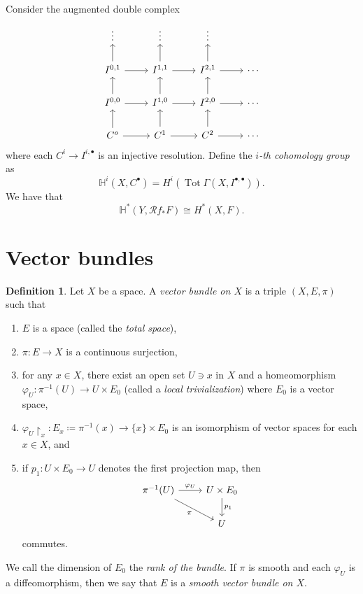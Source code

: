 \documentclass[10pt,letterpaper,cm]{nupset}
\theoremstyle{definition}
\newtheorem{definition}{Definition}[subsection]
\theoremstyle{theorem}
\theoremstyle{remark}
\newcommand{\1}{\mathbb{1}}
\newcommand{\0}{\vec 0}
\DeclareMathOperator{\tot}{Tot}
\begin{document}
Consider the augmented double complex 
\[
\begin{tikzcd}
\vdots                        & \vdots                        & \vdots                        &        \\
{I^{0,1}} \arrow[u] \arrow[r] & {I^{1,1}} \arrow[u] \arrow[r] & {I^{2,1}} \arrow[u] \arrow[r] & \cdots \\
{I^{0,0}} \arrow[u] \arrow[r] & {I^{1,0}} \arrow[u] \arrow[r] & {I^{2,0}} \arrow[u] \arrow[r] & \cdots \\
C^o \arrow[u] \arrow[r]       & C^1 \arrow[u] \arrow[r]       & C^2 \arrow[u] \arrow[r]       & \cdots
\end{tikzcd}
\]
where each $C^i \to I^{i, \bullet}$ is an injective resolution. Define the \textit{$i$-th cohomology group} as $$\mathbb{H}^i(X, C^{\bullet}) = H^i(\tot{\Gamma(X, I^{\bullet, \bullet})}) .  $$ We have that $$\mathbb{H}^{\ast}(Y, \mathcal{R}f_{\ast}{F}) \cong H^{\ast}(X, F)  .$$


\section{Vector bundles}

\begin{definition}
Let $X$ be a space. A \textit{vector bundle on $X$} is a triple $(X, E, \pi)$ such that
\begin{enumerate}[label=(\roman*)]
\item $E$ is a space (called the \textit{total space}), 
\item $\pi: E \to X$ is a continuous surjection,
\item for any $x\in X$, there exist an open set $U \ni x$ in $X$ and a homeomorphism $\varphi_U : \pi^{-1}(U) \to U \times E_0$ (called a \textit{local trivialization}) where $E_0$ is a vector space,
\item  $\varphi_U\restriction_x : E_x\coloneqq \pi^{-1}(x) \to \{x\} \times E_0$ is an isomorphism of vector spaces for each $x\in X$, and
\item if $p_1 : U \times E_0 \to U$ denotes the first projection map, then
\[
\begin{tikzcd}
\pi^{-1}(U) \arrow[r, "\varphi_U"] \arrow[rd, "\pi"'] & U \times E_0 \arrow[d, "p_1"] \\
                                                      & U                            
\end{tikzcd}
\]
commutes.
\end{enumerate}
We call the dimension of $E_0$ the \textit{rank of the bundle}. If $\pi$ is smooth and each $\varphi_U$ is a diffeomorphism, then we say that $E$ is a \textit{smooth vector bundle on $X$}.
\end{definition}
\end{document}
